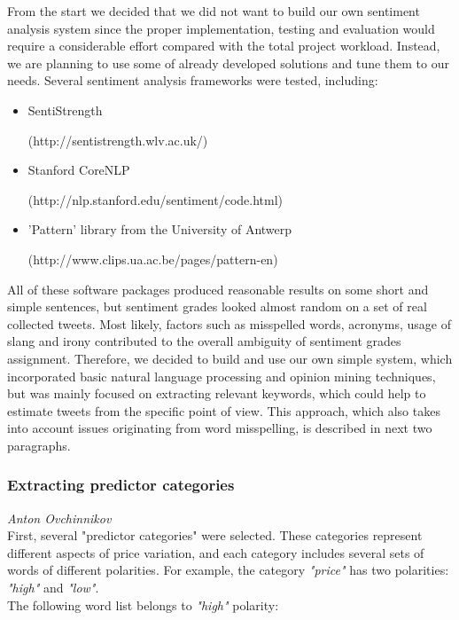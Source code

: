 From the start we decided that we did not want to build our own sentiment analysis system since the proper implementation, testing and evaluation would require a considerable effort compared with the total project workload. Instead, we are planning to use some of already developed solutions and tune them to our needs.
\newline \newline
Several sentiment analysis frameworks were tested, including:

\begin{itemize}
\item SentiStrength \par (http://sentistrength.wlv.ac.uk/)

\item Stanford CoreNLP \par (http://nlp.stanford.edu/sentiment/code.html)

\item 'Pattern' library from the University of Antwerp \par (http://www.clips.ua.ac.be/pages/pattern-en)
\end{itemize}
All of these software packages produced reasonable results on some short and simple sentences, but sentiment grades looked almost random on a set of real collected tweets. Most likely, factors such as misspelled words, acronyms, usage of slang and irony contributed to the overall ambiguity of sentiment grades assignment.
\newline \newline
Therefore, we decided to build and use our own simple system, which incorporated basic natural language processing and opinion mining techniques, but was mainly focused on extracting relevant keywords, which could help to estimate tweets from the specific point of view. This approach, which also takes into account issues originating from word misspelling, is described in next two paragraphs.

\subsubsection*{Extracting predictor categories}
\emph{Anton Ovchinnikov} \\
First, several "predictor categories" were selected. These categories represent different aspects of price variation, and each category includes several sets of words of different polarities. For example, the category \emph{"price"} has two polarities: \emph{"high"} and \emph{"low"}.
\\
The following word list belongs to \emph{"high"} polarity:

